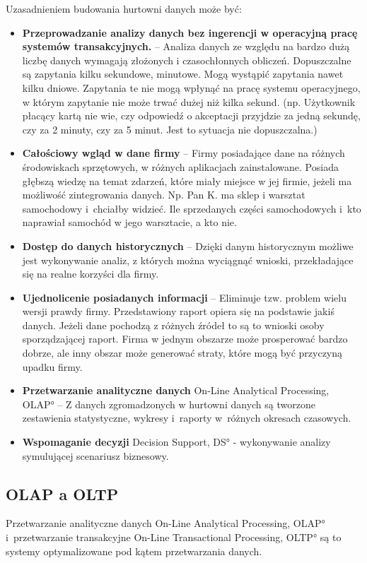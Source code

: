       Uzasadnieniem budowania hurtowni danych może być:
\begin{itemize}
 \item \textbf{Przeprowadzanie analizy danych bez ingerencji w operacyjną pracę systemów transakcyjnych.} --
    Analiza danych ze względu na bardzo dużą liczbę danych wymagają złożonych i czasochłonnych obliczeń.
    Dopuszczalne są zapytania kilku sekundowe, minutowe. Mogą wystąpić zapytania nawet kilku dniowe. 
    Zapytania te nie mogą wpłynąć na pracę systemu operacyjnego,
     w którym zapytanie nie może trwać dużej niż kilka sekund.
    (np. Użytkownik płacący kartą nie wie, czy odpowiedź o akceptacji przyjdzie za jedną sekundę, 
    czy za 2 minuty, czy za 5 minut.
    Jest to sytuacja nie dopuszczalna.)
\item \textbf{Całościowy wgląd w dane firmy} --
    Firmy posiadające dane na różnych środowiskach sprzętowych, w różnych aplikacjach zainstalowane.
    Posiada głębszą wiedzę na temat zdarzeń, które miały miejsce w jej firmie, jeżeli ma możliwość zintegrowania danych.
    Np. Pan K. ma sklep i warsztat samochodowy i~chciałby widzieć. 
    Ile sprzedanych części samochodowych i~kto naprawiał samochód w jego warsztacie, a kto nie.
\item \textbf{Dostęp do danych historycznych} -- 
   Dzięki danym historycznym możliwe jest wykonywanie analiz,
    z których można wyciągnąć wnioski, przekładające się na realne korzyści dla firmy.
\item \textbf{Ujednolicenie posiadanych informacji} -- 
   Eliminuje tzw. problem wielu wersji prawdy firmy. 
   Przedstawiony raport opiera się na podstawie jakiś danych. 
   Jeżeli dane pochodzą z różnych źródeł to są to wnioski osoby sporządzającej raport.
   Firma w jednym obszarze może prosperować bardzo dobrze,
    ale inny obszar może generować straty, które mogą być przyczyną upadku firmy.

\item \textbf{Przetwarzanie analityczne danych} \ang{On-Line Analytical Processing, OLAP} --  
  Z danych zgromadzonych w hurtowni danych są tworzone zestawienia statystyczne,
   wykresy i~raporty w~różnych okresach czasowych.
\item \textbf{Wspomaganie decyzji} \ang{Decision Support, DS} - wykonywanie 
  analizy symulującej scenariusz biznesowy. 
  
\end{itemize}


\subsection{OLAP a OLTP}
Przetwarzanie analityczne danych \ang{On-Line Analytical Processing, OLAP} 
 i~przetwarzanie transakcyjne \ang{On-Line Transactional Processing,  OLTP}
 są to systemy optymalizowane pod kątem przetwarzania danych. \cite{Vincent_Rainardi} \cite{TodMan}

